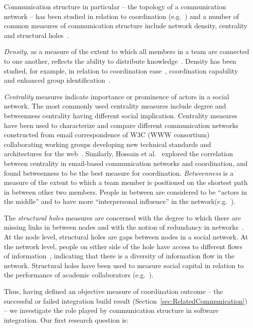 Communication structure in particular -- the topology of a communication network
-- has been studied in relation to coordination
(e.g.~\cite{hossain:cscw:2006,hinds:cscw:2006}) and a number of common measures of
communication structure include network density, centrality and structural
holes~\cite{Wasserman:1994sq,Freeman:1979rl}.


\emph{Density}, as a measure of the extent to which all members in a team are
connected to one another, reflects the ability to distribute
knowledge~\cite{Rulke:2000ys}. Density has been studied, for example, in relation
to coordination ease~\cite{hinds:cscw:2006}, coordination
capability~\cite{hossain:cscw:2006} and enhanced group
identification~\cite{RayReagans:2001os}.


\emph{Centrality} measures indicate importance or prominence of actors in a
social network. The most commonly used centrality measures include degree and
betweenness centrality having different social implication. Centrality measures
have been used to characterize and compare different communication networks
constructed from email correspondence of W3C (WWW consortium) collaborating
working groups developing new technical standards and architectures for the
web~\cite{Gloor:2003cikm}. Similarly, Hossain et al.~\cite{hossain:cscw:2006}
explored the correlation between centrality in email-based communication networks
and coordination, and found betweenness to be the best measure for coordination.
\emph{Betweenness} is a measure of the extent to which a team member is
positioned on the shortest path in between other two members. People in between
are considered to be ``actors in the middle'' and to have more ``interpersonal
influence'' in the
network(e.g.~\cite{Gloor:2003cikm,zimmermann:icse:2008,hossain:cscw:2006}).

The \emph{structural holes} measures are concerned with the degree to which there
are missing links in between nodes and with the notion of redundancy in
networks~\cite{Burt:1995vo}. At the node level, structural holes are gaps between
nodes in a social network. At the network level, people on either side of the
hole have access to different flows of information~\cite{Hargadon:1997asq},
indicating that there is a diversity of information flow in the network.
Structural holes have been used to measure social capital in relation to the
performance of academic collaborators (e.g.~\cite{Brambila:PICMET2007}).


Thus, having defined an objective measure of coordination outcome -- the
successful or failed integration build result
(Section~\ref{sec:RelatedCommunication}) -- we investigate the role played by
communication structure in software integration. Our first research question is:

